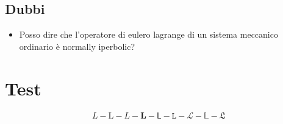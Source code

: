 \documentclass[Main]{subfiles}
\begin{document}
	\section{Dubbi}
	\begin{itemize}
		\item Posso dire che l'operatore di eulero lagrange di un sistema meccanico ordinario è normally iperbolic?
	\end{itemize}



\chapter{Test}
	$$L - \mathrm{L} - \mathit{L}  - \mathbf{L} - \mathsf{L} - \mathtt{L}- \mathcal{L}- \mathbb{L}- \mathfrak{L}$$
\end{document}
